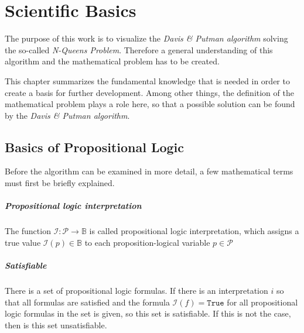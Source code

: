 

\chapter{Scientific Basics}
\label{ch:sciBasics}
The purpose of this work is to visualize the \textit{Davis \& Putman algorithm} solving the so-called \textit{N-Queens Problem}. Therefore a general understanding of this algorithm and the mathematical problem has to be created.

This chapter summarizes the fundamental knowledge that is needed in order to create a basis for further development. Among other things, the definition of the mathematical problem plays a role here, so that a possible solution can be found by the \textit{Davis \& Putman algorithm}.

\section{Basics of Propositional Logic}
\label{sec:sciProLogic}
Before the algorithm can be examined in more detail, a few mathematical terms must first be briefly explained.

\paragraph{Propositional logic interpretation}
The function $\mathcal{I}:\mathcal{P} \rightarrow \mathbb{B}$ is called propositional logic interpretation, which assigns a true value $\mathcal{I}(p) \in \mathbb{B}$ to each proposition-logical variable $p\in \mathcal{P}$

\paragraph{Satisfiable}
There is a set of propositional logic formulas. If there is an interpretation $i$ so that all formulas are satisfied and the formula $\mathcal{I}(f) = \texttt{True}$ \quad for all propositional logic formulas in the set is given, so this set is satisfiable. If this is not the case, then is this set unsatisfiable.

